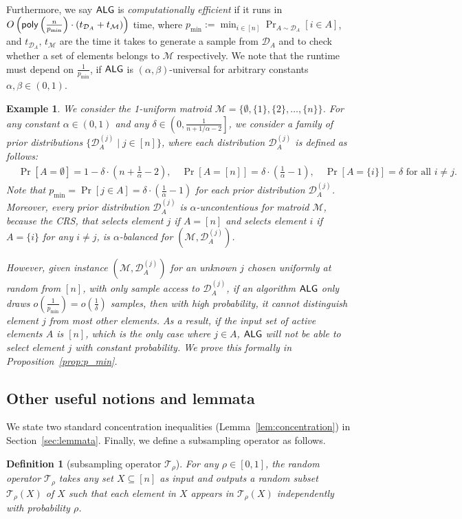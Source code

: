 \documentclass[11pt]{article}
\newcommand{\D}{\mathcal D}
\newcommand{\M}{{\mathcal M}}
\newcommand{\T}{{\mathcal T}}
\newcommand{\alg}{\textnormal{\sffamily ALG}}
\newcommand{\poly}{\textnormal{\sffamily poly}}
\newtheorem{definition}[theorem]{Definition}
\newtheorem{example}[theorem]{Example}
\begin{document}
Furthermore, we say $\alg$ is \emph{computationally efficient} if it runs in $O\left(\poly\left(\frac{n}{p_{\min}}\right)\cdot(t_{\D_A}+t_{\M})\right)$ time, where $p_{\min}:=\min_{i\in[n]}\Pr_{A\sim\D_A}[i\in A]$, and $t_{\D_A},\,t_{\M}$ are the time it takes to generate a sample from $\D_A$ and to check whether a set of elements belongs to $\M$ respectively. We note that the runtime must depend on $\frac{1}{p_{\min}}$, if $\alg$ is $(\alpha,\beta)$-universal for arbitrary constants $\alpha,\beta\in(0,1)$.
\begin{example}\label{ex:p_min}
We consider the 1-uniform matroid $\M=\{\emptyset,\{1\},\{2\},\dots,\{n\}\}$. For any constant $\alpha\in(0,1)$ and any $\delta\in\left(0,\frac{1}{n+1/\alpha-2}\right]$, we consider a family of prior distributions $\{\D_A^{(j)}\mid j\in[n]\}$, where each distribution $\D_A^{(j)}$ is defined as follows:
\begin{align*}
    &\Pr[A=\emptyset]=1-\delta\cdot\left(n+\frac{1}{\alpha}-2\right),\quad\Pr[A=[n]]=\delta\cdot\left(\frac{1}{\alpha}-1\right),\quad\Pr[A=\{i\}]=\delta \textrm{ for all } i\neq j.
\end{align*}
Note that $p_{\min}=\Pr[j\in A]=\delta\cdot\left(\frac{1}{\alpha}-1\right)$ for each prior distribution $\D_A^{(j)}$. Moreover, every prior distribution $\D_A^{(j)}$ is $\alpha$-uncontentious for matroid $\M$, because the CRS, that selects element $j$ if $A=[n]$ and selects element $i$ if $A=\{i\}$ for any $i\neq j$, is $\alpha$-balanced for $(\M,\D_A^{(j)})$.

However, given instance $(\M,\D_A^{(j)})$ for an unknown $j$ chosen uniformly at random from $[n]$, with only sample access to $\D_A^{(j)}$, if an algorithm $\alg$ only draws $o(\frac{1}{p_{\min}})=o(\frac{1}{\delta})$ samples, then with high probability, it cannot distinguish element $j$ from most other elements. As a result, if the input set of active elements $A$ is $[n]$, which is the only case where $j\in A$, $\alg$ will not be able to select element $j$ with constant probability. We prove this formally in Proposition~\ref{prop:p_min}.
\end{example}

\subsection{Other useful notions and lemmata}
We state two standard concentration inequalities (Lemma~\ref{lem:concentration}) in Section~\ref{sec:lemmata}. Finally, we define a subsampling operator as follows.
\begin{definition}[subsampling operator $\T_{\rho}$]
For any $\rho\in[0,1]$, the random operator $\T_{\rho}$ takes any set $X\subseteq [n]$ as input and outputs a random subset $\T_{\rho}(X)$ of $X$ such that each element in $X$ appears in $\T_{\rho}(X)$ independently with probability $\rho$.
\end{definition} 
\end{document}

